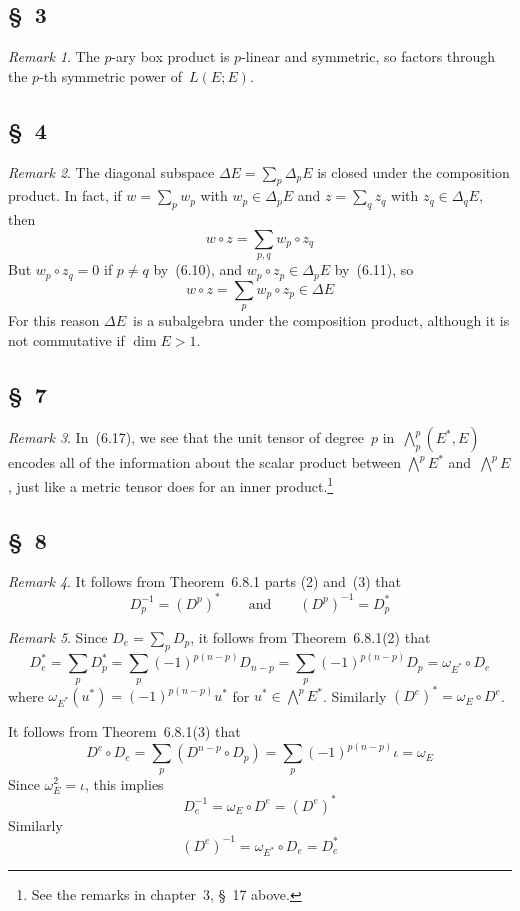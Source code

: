\documentclass[letterpaper,12pt]{article}
\newcommand{\after}{\circ}
\newcommand{\bigeprod}{\bigwedge}
\newcommand{\medeprod}{{\textstyle\bigeprod}}
\theoremstyle{definition}
\theoremstyle{remark}
\newtheorem*{rmk}{Remark}
\begin{document}
\subsection*{\S~3}
\begin{rmk}
The \(p\)-ary box product is \(p\)-linear and symmetric, so factors through the \(p\)-th symmetric power of~\(L(E;E)\).
\end{rmk}

\subsection*{\S~4}
\begin{rmk}
The diagonal subspace \(\Delta E=\sum_p\Delta_p E\) is closed under the composition product. In fact, if \(w=\sum_p w_p\) with \(w_p\in\Delta_p E\) and \(z=\sum_q z_q\) with \(z_q\in\Delta_q E\), then
\[w\after z=\sum_{p,q}w_p\after z_q\]
But \(w_p\after z_q=0\) if \(p\ne q\) by~(6.10), and \(w_p\after z_p\in\Delta_p E\) by~(6.11), so
\[w\after z=\sum_p w_p\after z_p\in\Delta E\]
For this reason \(\Delta E\)~is a subalgebra under the composition product, although it is not commutative if \(\dim E>1\).
\end{rmk}

\subsection*{\S~7}
\begin{rmk}
In~(6.17), we see that the unit tensor of degree~\(p\) in~\(\medeprod^p_p(E^*,E)\) encodes all of the information about the scalar product between \(\medeprod^p E^*\) and~\(\medeprod^p E\), just like a metric tensor does for an inner product.\footnote{See the remarks in chapter~3, \S~17 above.}
\end{rmk}

\subsection*{\S~8}
\begin{rmk}
It follows from Theorem~6.8.1 parts (2) and~(3) that
\[D_p^{-1}=(D^p)^*\qquad\text{and}\qquad(D^p)^{-1}=D_p^*\]
\end{rmk}

\begin{rmk}
Since \(D_e=\sum_p D_p\), it follows from Theorem~6.8.1(2) that
\[D_e^*=\sum_p D_p^*=\sum_p(-1)^{p(n-p)}D_{n-p}=\sum_p(-1)^{p(n-p)}D_p=\omega_{E^*}\after D_e\]
where \(\omega_{E^*}(u^*)=(-1)^{p(n-p)}u^*\) for \(u^*\in\medeprod^p E^*\). Similarly \((D^e)^*=\omega_E\after D^e\).

It follows from Theorem~6.8.1(3) that
\[D^e\after D_e=\sum_p(D^{n-p}\after D_p)=\sum_p(-1)^{p(n-p)}\iota=\omega_E\]
Since \(\omega_E^2=\iota\), this implies
\[D_e^{-1}=\omega_E\after D^e=(D^e)^*\]
Similarly
\[(D^e)^{-1}=\omega_{E^*}\after D_e=D_e^*\]
\end{rmk}
\end{document}
